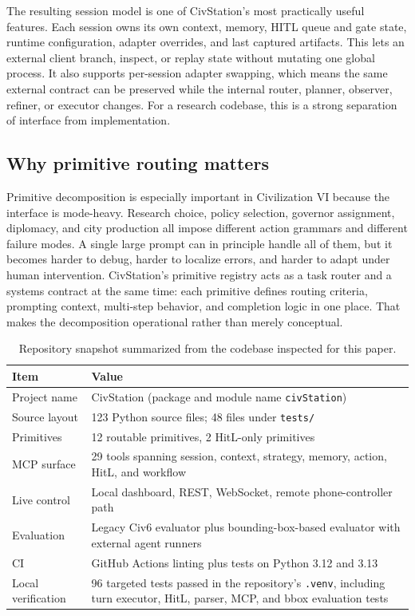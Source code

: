 The resulting session model is one of CivStation's most practically useful features. Each session owns its own context, memory, HITL queue and gate state, runtime configuration, adapter overrides, and last captured artifacts. This lets an external client branch, inspect, or replay state without mutating one global process. It also supports per-session adapter swapping, which means the same external contract can be preserved while the internal router, planner, observer, refiner, or executor changes. For a research codebase, this is a strong separation of interface from implementation.

\subsection{Why primitive routing matters}

Primitive decomposition is especially important in Civilization VI because the interface is mode-heavy. Research choice, policy selection, governor assignment, diplomacy, and city production all impose different action grammars and different failure modes. A single large prompt can in principle handle all of them, but it becomes harder to debug, harder to localize errors, and harder to adapt under human intervention. CivStation's primitive registry acts as a task router and a systems contract at the same time: each primitive defines routing criteria, prompting context, multi-step behavior, and completion logic in one place. That makes the decomposition operational rather than merely conceptual.

\begin{table}[t]
\centering
\caption{Repository snapshot summarized from the codebase inspected for this paper.}
\label{tab:project-snapshot}
\begin{tabular}{p{2.0cm} p{5.0cm}}
\toprule
\textbf{Item} & \textbf{Value} \\
\midrule
Project name & CivStation (package and module name \texttt{civStation}) \\
Source layout & 123 Python source files; 48 files under \texttt{tests/} \\
Primitives & 12 routable primitives, 2 HitL-only primitives \\
MCP surface & 29 tools spanning session, context, strategy, memory, action, HitL, and workflow \\
Live control & Local dashboard, REST, WebSocket, remote phone-controller path \\
Evaluation & Legacy Civ6 evaluator plus bounding-box-based evaluator with external agent runners \\
CI & GitHub Actions linting plus tests on Python 3.12 and 3.13 \\
Local verification & 96 targeted tests passed in the repository's \texttt{.venv}, including turn executor, HitL, parser, MCP, and bbox evaluation tests \\
\bottomrule
\end{tabular}
\end{table}

